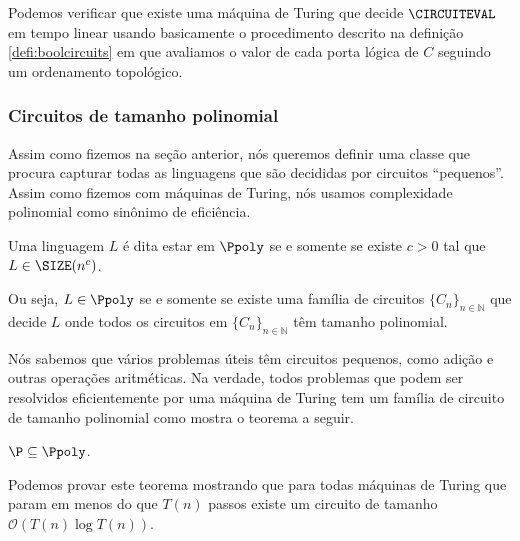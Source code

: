 Podemos verificar que existe uma máquina de Turing que decide $\CIRCUITEVAL$ em tempo linear usando basicamente o procedimento descrito na definição \ref{defi:boolcircuits} em que avaliamos o valor de cada porta lógica de $C$ seguindo um ordenamento topológico.

\subsubsection{Circuitos de tamanho polinomial}

Assim como fizemos na seção anterior, nós queremos definir uma classe que procura capturar todas as linguagens que são decididas por circuitos ``pequenos''. Assim como fizemos com máquinas de Turing, nós usamos complexidade polinomial como sinônimo de eficiência.

\begin{defi} [$\Ppoly$]

Uma linguagem $L$ é dita estar em $\Ppoly$ se e somente se existe $c > 0$ tal que $L \in \SIZE(n^{c})$.

\end{defi}

Ou seja, $L \in \Ppoly$ se e somente se existe uma família de circuitos $\{C_{n}\}_{n \in \mathbb{N}}$ que decide $L$ onde todos os circuitos em $\{C_{n}\}_{n \in \mathbb{N}}$ têm tamanho polinomial.

Nós sabemos que vários problemas úteis têm circuitos pequenos, como adição e outras operações aritméticas. Na verdade, todos problemas que podem ser resolvidos eficientemente por uma máquina de Turing tem um família de circuito de tamanho polinomial como mostra o teorema a seguir.

\begin{teo} \label{teo:pp/poly}

$\P \subseteq \Ppoly$. 

\end{teo}

Podemos provar este teorema mostrando que para todas máquinas de Turing que param em menos do que $T(n)$ passos existe um circuito de tamanho $\mathcal{O}(T(n)\log T(n))$.

